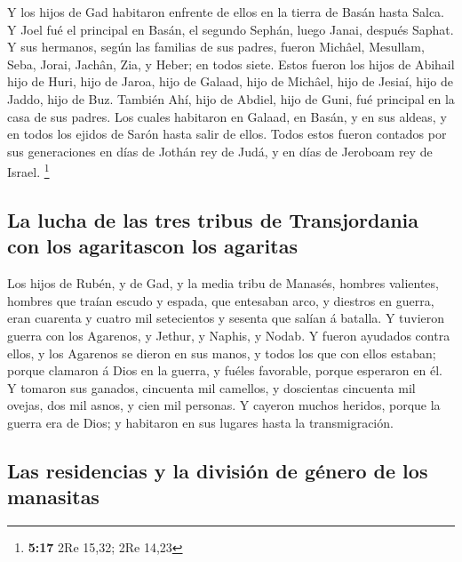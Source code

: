  Y los hijos de Gad habitaron enfrente de ellos en la
tierra de Basán hasta Salca.  Y Joel fué el principal en
Basán, el segundo Sephán, luego Janai, después Saphat.  Y
sus hermanos, según las familias de sus padres, fueron Michâel,
Mesullam, Seba, Jorai, Jachân, Zia, y Heber; en todos siete.
 Estos fueron los hijos de Abihail hijo de Huri, hijo de
Jaroa, hijo de Galaad, hijo de Michâel, hijo de Jesiaí, hijo de Jaddo,
hijo de Buz.  También Ahí, hijo de Abdiel, hijo de Guni,
fué principal en la casa de sus padres.  Los cuales
habitaron en Galaad, en Basán, y en sus aldeas, y en todos los ejidos de
Sarón hasta salir de ellos.  Todos estos fueron contados
por sus generaciones en días de Jothán rey de Judá, y en días de
Jeroboam rey de Israel. \footnote{\textbf{5:17} 2Re 15,32; 2Re 14,23}

\hypertarget{la-lucha-de-las-tres-tribus-de-transjordania-con-los-agaritascon-los-agaritas}{%
\subsection{La lucha de las tres tribus de Transjordania con los
agaritascon los
agaritas}\label{la-lucha-de-las-tres-tribus-de-transjordania-con-los-agaritascon-los-agaritas}}

 Los hijos de Rubén, y de Gad, y la media tribu de
Manasés, hombres valientes, hombres que traían escudo y espada, que
entesaban arco, y diestros en guerra, eran cuarenta y cuatro mil
setecientos y sesenta que salían á batalla.  Y tuvieron
guerra con los Agarenos, y Jethur, y Naphis, y Nodab.  Y
fueron ayudados contra ellos, y los Agarenos se dieron en sus manos, y
todos los que con ellos estaban; porque clamaron á Dios en la guerra, y
fuéles favorable, porque esperaron en él.  Y tomaron sus
ganados, cincuenta mil camellos, y doscientas cincuenta mil ovejas, dos
mil asnos, y cien mil personas.  Y cayeron muchos
heridos, porque la guerra era de Dios; y habitaron en sus lugares hasta
la transmigración.

\hypertarget{las-residencias-y-la-divisiuxf3n-de-guxe9nero-de-los-manasitas}{%
\subsection{Las residencias y la división de género de los
manasitas}\label{las-residencias-y-la-divisiuxf3n-de-guxe9nero-de-los-manasitas}}


